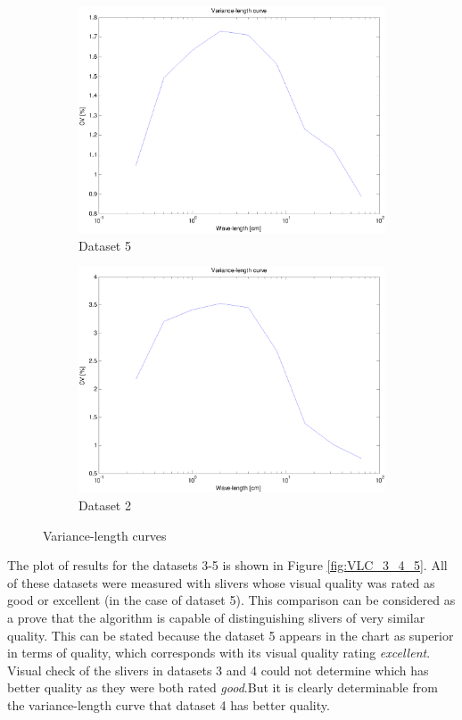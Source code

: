 \documentclass[twoside]{ctuthesis}
\theoremstyle{plain}
\theoremstyle{definition}
\theoremstyle{note}
\begin{document}
\begin{figure}
	\centering
	\begin{subfigure}{0.5\textwidth}
		\centering
		\includegraphics[width=1.0\linewidth]{full_VLC_11.eps}
		\caption{Dataset 5}
		\label{fig:sub_dataset5}
	\end{subfigure}%
	\begin{subfigure}{0.5\textwidth}
		\centering
		\includegraphics[width=1.0\linewidth]{full_VLC_6.eps}
		\caption{Dataset 2}
		\label{fig:sub_dataset2}
	\end{subfigure}
	\caption{Variance-length curves}
	\label{fig:vlc_curves}
\end{figure}

The plot of results for the datasets 3-5 is shown in Figure \ref{fig:VLC_3_4_5}. All of these datasets were measured with slivers whose visual quality was rated as good or excellent (in the case of dataset 5). This comparison can be considered as a prove that the algorithm is capable of distinguishing slivers of very similar quality. This can be stated because the dataset 5 appears in the chart as superior in terms of quality, which corresponds with its visual quality rating \textit{excellent}. Visual check of the slivers in datasets 3 and 4 could not determine which has better quality as they were both rated \textit{good}.But it is clearly determinable from the variance-length curve that dataset 4 has better quality.
\end{document}
